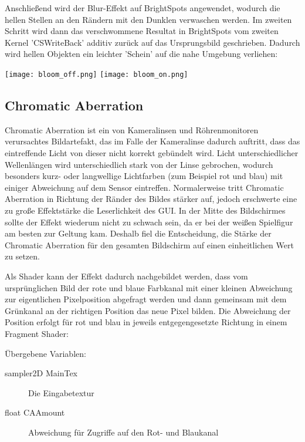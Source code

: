 Anschlie{\ss}end wird der Blur-Effekt auf BrightSpots angewendet, wodurch die hellen Stellen an den Rändern mit den Dunklen verwaschen werden. Im zweiten Schritt wird dann das verschwommene Resultat in BrightSpots vom zweiten Kernel 'CSWriteBack' additiv zurück auf das Ursprungsbild geschrieben. Dadurch wird hellen Objekten ein leichter 'Schein' auf die nahe Umgebung verliehen:

\captionsetup{type=figure}
\texttt{[image: bloom\_off.png]}
\texttt{[image: bloom\_on.png]}




\subsection{Chromatic Aberration}

Chromatic Aberration ist ein von Kameralinsen und Röhrenmonitoren verursachtes Bildartefakt, das im Falle der Kameralinse dadurch auftritt, dass das eintreffende Licht von dieser nicht korrekt gebündelt wird. Licht unterschiedlicher Wellenlängen wird unterschiedlich stark von der Linse gebrochen, wodurch besonders kurz- oder langwellige Lichtfarben (zum Beispiel rot und blau) mit einiger Abweichung auf dem Sensor eintreffen. Normalerweise tritt Chromatic Aberration in Richtung der Ränder des Bildes stärker auf, jedoch erschwerte eine zu gro{\ss}e Effektstärke die Leserlichkeit des GUI. In der Mitte des Bildschirmes sollte der Effekt wiederum nicht zu schwach sein, da er bei der wei{\ss}en Spielfigur am besten zur Geltung kam. Deshalb fiel die Entscheidung, die Stärke der Chromatic Aberration für den gesamten Bildschirm auf einen einheitlichen Wert zu setzen.

Als Shader kann der Effekt dadurch nachgebildet werden, dass vom ursprünglichen Bild der rote und blaue Farbkanal mit einer kleinen Abweichung zur eigentlichen Pixelposition abgefragt werden und dann gemeinsam mit dem Grünkanal an der richtigen Position das neue Pixel bilden. Die Abweichung der Position erfolgt für rot und blau in jeweils entgegengesetzte Richtung in einem Fragment Shader:

Übergebene Variablen:
\begin{description}
\item[sampler2D MainTex] Die Eingabetextur
\item[float CAAmount] Abweichung für Zugriffe auf den Rot- und Blaukanal
\end{description}

